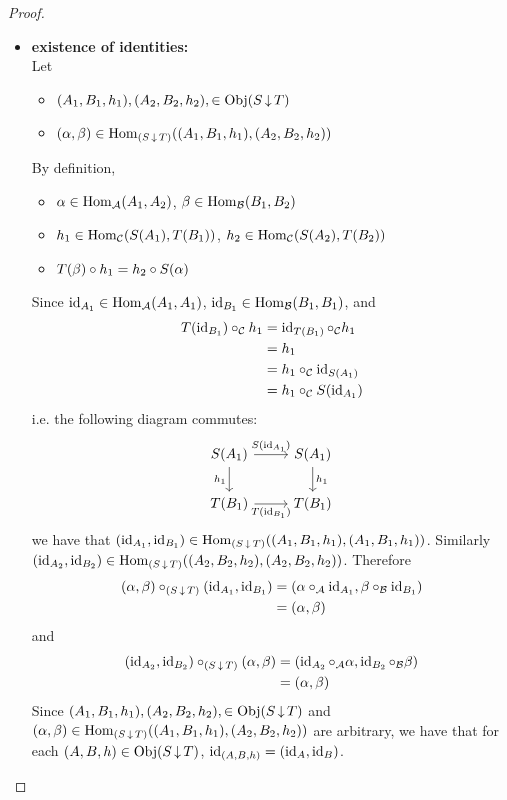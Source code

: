 \documentclass{book}
\begin{document}
\begin{proof}
\begin{itemize}
			\item \textbf{existence of identities:} \\
			Let
			\begin{itemize}
				\item $(A_1, B_1, h_1), (A_2, B_2, h_2), \in \operatorname{Obj}(S \operatorname{\downarrow} T)$
				\item $(\alpha, \beta) \in \operatorname{Hom}_{(S \operatorname{\downarrow} T)}((A_1, B_1, h_1), (A_2, B_2, h_2))$ 
			\end{itemize}
			By definition, 
			\begin{itemize}
				\item $\alpha \in \operatorname{Hom}_{\mathcal{A}}(A_1, A_2)$, $\beta \in \operatorname{Hom}_{\mathcal{B}}(B_1, B_2)$
				\item $h_1 \in \operatorname{Hom}_{\mathcal{C}}(S(A_1), T(B_1))$, $h_2 \in \operatorname{Hom}_{\mathcal{C}}(S(A_2), T(B_2))$ 
				\item $T(\beta) \circ h_1 = h_2 \circ S(\alpha)$
			\end{itemize}
			Since $\operatorname{id}_{A_1} \in \operatorname{Hom}_{\mathcal{A}}(A_1, A_1)$, $\operatorname{id}_{B_1} \in \operatorname{Hom}_{\mathcal{B}}(B_1, B_1)$, and
			\begin{align*}
				T(\operatorname{id}_{B_1}) \circ_{\mathcal{C}}  h_1 
				& = \operatorname{id}_{T(B_1)} \circ_{\mathcal{C}} h_1 \\
				& = h_1 \\
				& = h_1 \circ_{\mathcal{C}} \operatorname{id}_{S(A_1)} \\
				& = h_1 \circ_{\mathcal{C}} S(\operatorname{id}_{A_1}) 
			\end{align*}
			i.e. the following diagram commutes:
			\[
			\begin{tikzcd}
				S(A_1) \arrow[r, "S(\id_{A_1})"] \arrow[d, "h_1"']  & S(A_1)  \arrow[d, "h_1"] \\
				T(B_1) \arrow[r, "T(\id_{B_1})"']                   & T(B_1)
			\end{tikzcd}
			\]
			we have that $(\operatorname{id}_{A_1}, \operatorname{id}_{B_1}) \in \operatorname{Hom}_{(S \operatorname{\downarrow} T)}((A_1, B_1, h_1), (A_1, B_1, h_1))$. Similarly $(\operatorname{id}_{A_2}, \operatorname{id}_{B_2}) \in \operatorname{Hom}_{(S \operatorname{\downarrow} T)}((A_2, B_2, h_2), (A_2, B_2, h_2))$. Therefore
			\begin{align*}
				(\alpha, \beta) \circ_{(S \operatorname{\downarrow} T)} (\operatorname{id}_{A_1}, \operatorname{id}_{B_1}) 
				& = (\alpha \circ_{\mathcal{A}} \operatorname{id}_{A_1}, \beta \circ_{\mathcal{B}} \operatorname{id}_{B_1}) \\
				& = (\alpha, \beta)
			\end{align*}
			and 
			\begin{align*}
				(\operatorname{id}_{A_2}, \operatorname{id}_{B_2}) \circ_{(S\operatorname{\downarrow} T)} (\alpha, \beta) 
				& = (\operatorname{id}_{A_2} \circ_{\mathcal{A}} \alpha ,  \operatorname{id}_{B_2} \circ_{\mathcal{B}} \beta ) \\
				& = (\alpha, \beta)
			\end{align*}
			Since $(A_1, B_1, h_1), (A_2, B_2, h_2), \in \operatorname{Obj}(S \operatorname{\downarrow} T)$ and\\ $(\alpha, \beta) \in \operatorname{Hom}_{(S \operatorname{\downarrow} T)}((A_1, B_1, h_1), (A_2, B_2, h_2))$ are arbitrary, we have that for each $(A, B, h) \in \operatorname{Obj}(S \operatorname{\downarrow} T)$, $\operatorname{id}_{(A, B, h)} = (\operatorname{id}_A, \operatorname{id}_B)$.
		\end{itemize}
	\end{proof}
\end{document}
